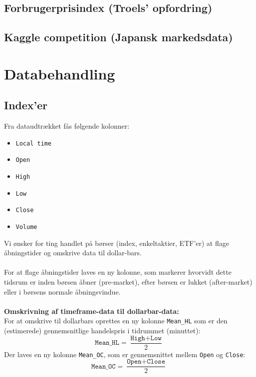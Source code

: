 \documentclass[a4paper,danish,12pt]{article}
\begin{document}
\subsection*{Forbrugerprisindex (Troels' opfordring)}


\subsection*{Kaggle competition (Japansk markedsdata)}


\section{Databehandling}

\subsection*{Index'er}
Fra dataudtrækket fås følgende kolonner:
\begin{itemize}
\item \texttt{Local time}
\item \texttt{Open}
\item \texttt{High}
\item \texttt{Low}
\item \texttt{Close}
\item \texttt{Volume}
\end{itemize}
Vi ønsker for ting handlet på børser (index, enkeltaktier, ETF'er) at flage åbningstider og omskrive data til dollar-bars.\\
\\
For at flage åbningstider laves en ny kolonne, som markerer hvorvidt dette tidsrum er inden børsen åbner (pre-market), efter børsen er lukket (after-market) eller i børsens normale åbningsvindue.
\\\\
\textbf{Omskrivning af timeframe-data til dollarbar-data:} \\
For at omskrive til dollarbars oprettes en ny kolonne \texttt{Mean\_HL} som er den (estimerede) gennemsnitlige handelspris i tidrummet (minuttet):
\begin{equation*}
\texttt{Mean\_HL} = \frac{\texttt{High}+\texttt{Low}}{2}
\end{equation*} 
Der laves en ny kolonne \texttt{Mean\_OC}, som er gennemsnittet mellem \texttt{Open} og \texttt{Close}:
\begin{equation*}
\texttt{Mean\_OC} = \frac{\texttt{Open}+\texttt{Close}}{2}
\end{equation*} 
\end{document}
